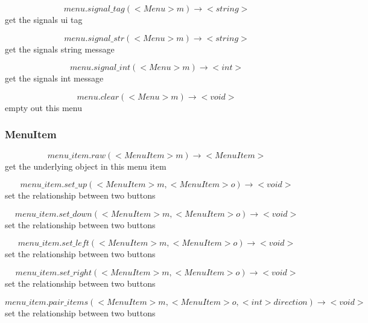 \documentclass[11pt,fleqn]{book} %
\begin{document}
\begin{equation}
menu.signal\_tag(<Menu> m) \rightarrow <string>
\end{equation}
get the signals ui tag

\begin{equation}
menu.signal\_str(<Menu> m) \rightarrow <string>
\end{equation}
get the signals string message

\begin{equation}
menu.signal\_int(<Menu> m) \rightarrow <int>
\end{equation}
get the signals int message

\begin{equation}
menu.clear(<Menu> m) \rightarrow <void>
\end{equation}
empty out this menu

\subsubsection{MenuItem}
\begin{equation}
menu\_item.raw(<MenuItem> m) \rightarrow <MenuItem>
\end{equation}
get the underlying object in this menu item

\begin{equation}
menu\_item.set\_up(<MenuItem> m, <MenuItem> o) \rightarrow <void>
\end{equation}
set the relationship between two buttons

\begin{equation}
menu\_item.set\_down(<MenuItem> m, <MenuItem> o) \rightarrow <void>
\end{equation}
set the relationship between two buttons

\begin{equation}
menu\_item.set\_left(<MenuItem> m, <MenuItem> o) \rightarrow <void>
\end{equation}
set the relationship between two buttons

\begin{equation}
menu\_item.set\_right(<MenuItem> m, <MenuItem> o) \rightarrow <void>
\end{equation}
set the relationship between two buttons

\begin{equation}
menu\_item.pair\_items(<MenuItem> m, <MenuItem> o, <int> direction) \rightarrow <void>
\end{equation}
set the relationship between two buttons
\end{document}
